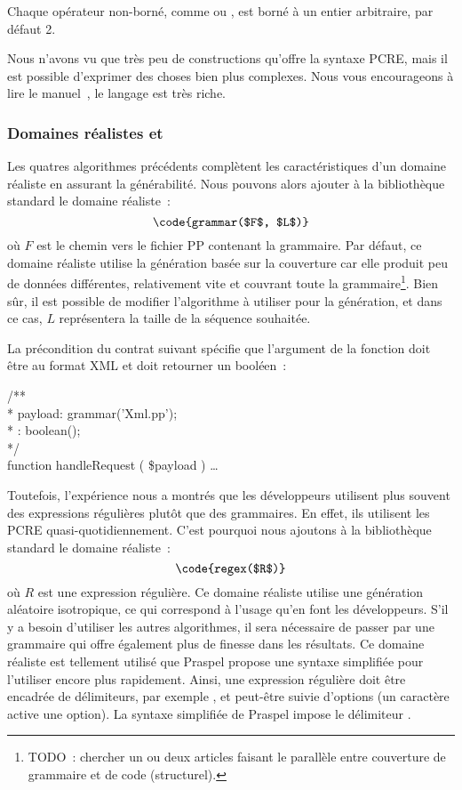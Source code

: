 Chaque opérateur non-borné, comme \code{*} ou \code{+}, est borné à un entier
arbitraire, par défaut 2.

Nous n'avons vu que très peu de constructions qu'offre la syntaxe PCRE, mais il
est possible d'exprimer des choses bien plus complexes. Nous vous encourageons à
lire le manuel~, le langage est très riche.

\subsubsection{Domaines réalistes  et }

Les quatres algorithmes précédents complètent les caractéristiques d'un domaine
réaliste en assurant la générabilité. Nous pouvons alors ajouter à la
bibliothèque standard le domaine réaliste~:
%
$$\code{grammar($F$, $L$)}$$
%
où $F$ est le chemin vers le fichier PP contenant la grammaire. Par défaut, ce
domaine réaliste utilise la génération basée sur la couverture car elle produit
peu de données différentes, relativement vite et couvrant toute la
grammaire\footnote{TODO~: chercher un ou deux articles faisant le parallèle
entre couverture de grammaire et de code (structurel).}. Bien sûr, il est
possible de modifier l'algorithme à utiliser pour la génération, et dans ce cas,
$L$ représentera la taille de la séquence souhaitée.

\begin{example}

La précondition du contrat suivant spécifie que l'argument  de
la fonction  doit être au format XML et doit retourner
un booléen~:

\begin{pre}
/** \\
 * \arequires payload: grammar('Xml.pp'); \\
 * \aensures  \aresult: boolean(); \\
 */ \\
function handleRequest ( \$payload ) { … }
\end{pre}

\end{example}

Toutefois, l'expérience nous a montrés que les développeurs utilisent plus
souvent des expressions régulières plutôt que des grammaires. En effet, ils
utilisent les PCRE quasi-quotidiennement. C'est pourquoi nous ajoutons à la
bibliothèque standard le domaine réaliste~:
%
$$\code{regex($R$)}$$
%
où $R$ est une expression régulière. Ce domaine réaliste utilise une génération
aléatoire isotropique, ce qui correspond à l'usage qu'en font les développeurs.
S'il y a besoin d'utiliser les autres algorithmes, il sera nécessaire de passer
par une grammaire qui offre également plus de finesse dans les résultats. Ce
domaine réaliste est tellement utilisé que Praspel propose une syntaxe
simplifiée pour l'utiliser encore plus rapidement. Ainsi, une expression
régulière doit être encadrée de délimiteurs, par exemple \code{/}, et peut-être
suivie d'options (un caractère active une option). La syntaxe simplifiée de
Praspel impose le délimiteur \code{/}.

